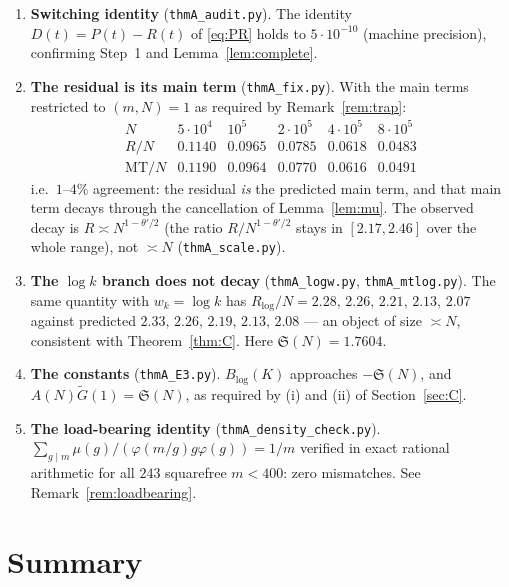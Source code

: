 \documentclass[11pt,a4paper]{article}
\theoremstyle{plain}
\theoremstyle{definition}
\renewcommand{\SS}{\mathfrak{S}}
\begin{document}
\begin{enumerate}
\item \textbf{Switching identity} (\texttt{thmA\_audit.py}). The
identity $D(t)=P(t)-R(t)$ of \eqref{eq:PR} holds to $5\cdot10^{-10}$
(machine precision), confirming Step~1 and Lemma~\ref{lem:complete}.

\item \textbf{The residual is its main term} (\texttt{thmA\_fix.py}).
With the main terms restricted to $(m,N)=1$ as required by
Remark~\ref{rem:trap}:
\[
\begin{array}{r|ccccc}
 N & 5\cdot10^4 & 10^5 & 2\cdot10^5 & 4\cdot10^5 & 8\cdot10^5\\\hline
 R/N               & 0.1140 & 0.0965 & 0.0785 & 0.0618 & 0.0483\\
 \mathrm{MT}/N     & 0.1190 & 0.0964 & 0.0770 & 0.0616 & 0.0491
\end{array}
\]
i.e.\ $1$--$4\%$ agreement: the residual \emph{is} the predicted main
term, and that main term decays through the cancellation of
Lemma~\ref{lem:mu}. The observed decay is
$R\asymp N^{1-\theta'/2}$ (the ratio $R/N^{1-\theta'/2}$ stays in
$[2.17,2.46]$ over the whole range), not $\asymp N$
(\texttt{thmA\_scale.py}).

\item \textbf{The $\log k$ branch does not decay}
(\texttt{thmA\_logw.py}, \texttt{thmA\_mtlog.py}). The same quantity
with $w_k=\log k$ has $R_{\log}/N=2.28,\,2.26,\,2.21,\,2.13,\,2.07$
against predicted $2.33,\,2.26,\,2.19,\,2.13,\,2.08$ --- an object of
size $\asymp N$, consistent with Theorem~\ref{thm:C}. Here
$\SS(N)=1.7604$.

\item \textbf{The constants} (\texttt{thmA\_E3.py}). $B_{\log}(K)$
approaches $-\SS(N)$, and $A(N)\widetilde G(1)=\SS(N)$, as required by
(i) and (ii) of Section~\ref{sec:C}.

\item \textbf{The load-bearing identity}
(\texttt{thmA\_density\_check.py}). $\sum_{g\mid m}
\mu(g)/(\varphi(m/g)g\varphi(g))=1/m$ verified in exact rational
arithmetic for all $243$ squarefree $m<400$: zero mismatches. See
Remark~\ref{rem:loadbearing}.
\end{enumerate}

\section{Summary}
\end{document}
